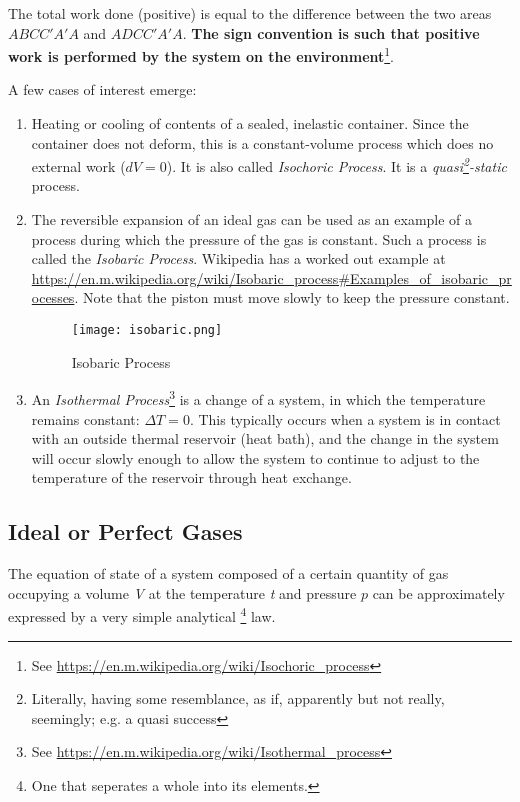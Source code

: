 \documentclass[11pt]{article}         %
\begin{document}
The total work done (positive) is equal to the difference between the two areas $ABCC'A'A$ and $ADCC'A'A$.
\textbf{The sign convention is such that positive work is performed by the system on the environment}\footnote{See \url{https://en.m.wikipedia.org/wiki/Isochoric_process}}. 

A few cases of interest emerge:
\begin{enumerate}
    \item Heating or cooling of contents of a sealed, inelastic container. Since the container does not deform, this is a constant-volume process which does no external work ($dV = 0$). It is also called \emph{Isochoric Process}. It is a \emph{quasi\footnote{Literally, having some resemblance, as if, apparently but not really, seemingly; e.g. a quasi success}-static} process.
    \item The reversible expansion of an ideal gas can be used as an example of a process during which the pressure of the gas is constant. Such a process is called the \emph{Isobaric Process}. Wikipedia has a worked out example at \url{https://en.m.wikipedia.org/wiki/Isobaric_process#Examples_of_isobaric_processes}. Note that the piston must move slowly to keep the pressure constant.
\begin{figure}[ht!]
    \centering
    \texttt{[image: isobaric.png]}
    \caption{Isobaric Process}
    \label{fig: isobaric-process}
\end{figure}
    \item An \emph{Isothermal Process}\footnote{See \url{https://en.m.wikipedia.org/wiki/Isothermal_process}} is a change of a system, in which the temperature remains constant: $\Delta T=0$. This typically occurs when a system is in contact with an outside thermal reservoir (heat bath), and the change in the system will occur slowly enough to allow the system to continue to adjust to the temperature of the reservoir through heat exchange.
\end{enumerate}

\subsection{Ideal or Perfect Gases}
\label{sec: ideal-perfect-gases}
The equation of state of a system composed of a certain quantity of gas occupying a volume \emph{V} at the temperature \emph{t} and pressure $p$ can be approximately expressed by a very simple analytical \footnote{One that seperates a whole into its elements.} law. 
\end{document}
